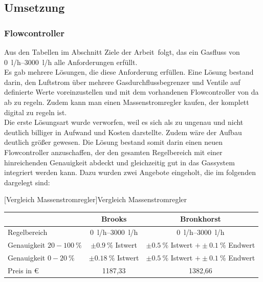 \subsection{Umsetzung}

\subsubsection{Flowcontroller}

Aus den Tabellen im Abschnitt \glqq Ziele der Arbeit\grqq \ folgt, das ein Gasfluss von \SIrange{0}{3000}{l/h} alle Anforderungen erfüllt. \\
Es gab mehrere Lösungen, die diese Anforderung erfüllen. Eine Lösung bestand darin, den Luftstrom über mehrere Gasdurchflussbegrenzer und Ventile auf definierte Werte voreinzustellen und mit dem vorhandenen Flowcontroller von da ab zu regeln. Zudem kann man einen Massenstromregler kaufen, der komplett digital zu regeln ist. \\
Die erste Lösungsart wurde verworfen, weil es sich als zu ungenau und nicht deutlich billiger in Aufwand und Kosten darstellte. Zudem wäre der Aufbau deutlich größer gewesen. Die Lösung bestand somit darin einen neuen Flowcontroller anzuschaffen, der den gesamten Regelbereich mit einer hinreichenden Genauigkeit abdeckt und gleichzeitig gut in das Gassystem integriert werden kann. Dazu wurden zwei Angebote eingeholt, die im folgenden dargelegt sind:

\begin{center}
	[Vergleich Massenstromregler]{Vergleich Massenstromregler}
	\begin{tabular}{l|c|c}
		& Brooks & Bronkhorst \\ 
		\hline Regelbereich & \SIrange{0}{3000}{l/h} & \SIrange{0}{3000}{l/h} \\ 
		\hline Genauigkeit $20 - \SI{100}{\%}$ & $\pm \SI{0,9}{\%}$ Istwert & $\pm \SI{0,5}{\%}$ Istwert $+ \pm \SI{0,1}{\%}$ Endwert\\ 
		\hline Genauigkeit $0 - \SI{20}{\%}$ & $\pm \SI{0,18}{\%}$ Istwert & $\pm \SI{0,5}{\%}$ Istwert $+ \pm \SI{0,1}{\%}$ Endwert \\ 
		\hline Preis in \euro & 1187,33 & 1382,66 \\ 
	\end{tabular} 
\end{center}


\vspace{0,5cm}

